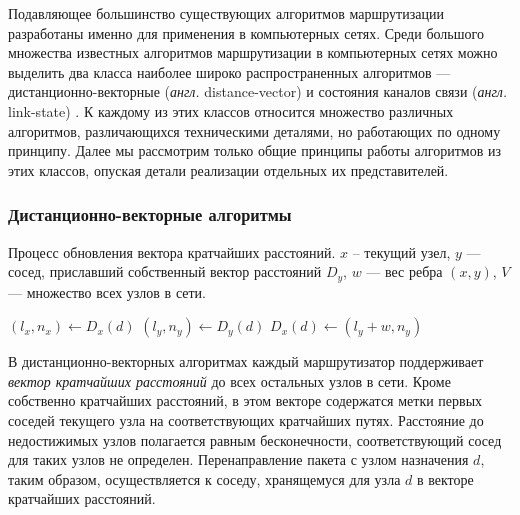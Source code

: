 \documentclass[specification,annotation,times]{itmo-student-thesis}
\theoremstyle{definition}
\begin{document}
Подавляющее большинство существующих алгоритмов маршрутизации разработаны именно
для применения в компьютерных сетях. Среди большого множества известных
алгоритмов маршрутизации в компьютерных сетях можно выделить два класса
наиболее широко распространенных алгоритмов --- дистанционно-векторные
(\textit{англ.} distance-vector) \cite{arpanet-orig} и состояния каналов связи
(\textit{англ.} link-state)
\cite{link-state-arpanet}. К каждому из этих классов относится множество различных
алгоритмов, различающихся техническими деталями, но работающих по одному
принципу. Далее мы рассмотрим только общие принципы работы алгоритмов из этих
классов, опуская детали реализации отдельных их представителей.

\subsubsection{Дистанционно-векторные алгоритмы}\label{overview:networks:dv}


\begin{algorithm}[!h]
\caption{Процесс обновления вектора кратчайших расстояний. $x$ -- текущий узел,
$y$ --- сосед, приславший собственный вектор расстояний $D_y$, $w$ --- вес ребра
  $(x, y)$, $V$ --- множество всех узлов в сети.}
\label{dv-pseudocode}
\begin{algorithmic}[1]
      \State $(l_x, n_x) \gets D_x(d)$
      \State $(l_y, n_y) \gets D_y(d)$
				\State $D_x(d) \gets (l_y + w, n_y)$
			\EndIf
		\EndFor
	\EndProcedure
\end{algorithmic}
\end{algorithm}

В дистанционно-векторных алгоритмах каждый маршрутизатор поддерживает
\textit{вектор кратчайших расстояний} до всех остальных узлов в сети. Кроме
собственно кратчайших расстояний, в этом векторе содержатся метки первых соседей
текущего узла на соответствующих кратчайших путях. Расстояние до недостижимых
узлов полагается равным бесконечности, соответствующий сосед для таких узлов не
определен. Перенаправление пакета с узлом назначения $d$, таким образом,
осуществляется к соседу, хранящемуся для узла $d$ в векторе кратчайших
расстояний.
\end{document}
